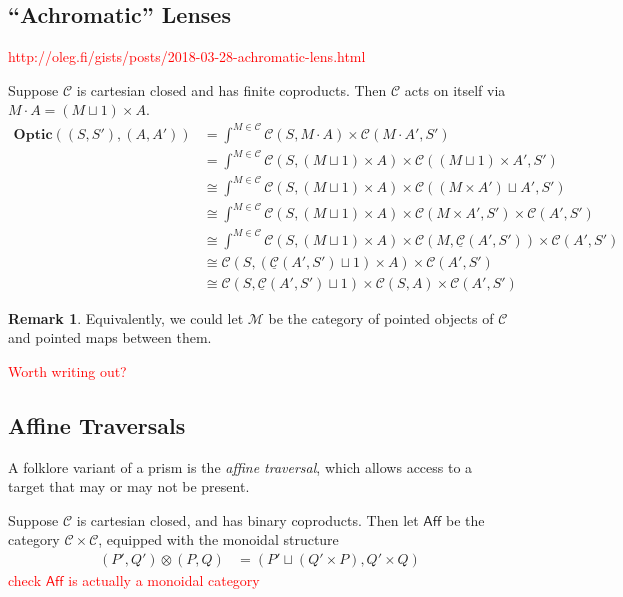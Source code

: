 \documentclass[11pt,a4paper]{article}
\theoremstyle{plain}
\theoremstyle{definition}
\newtheorem{remark}[theorem]{Remark}
\newcommand{\C}{\mathscr{C}}
\newcommand{\homC}{\underline{\C}}
\newcommand{\M}{\mathscr{M}}
\newcommand{\Optic}{\mathbf{Optic}}
\newcommand{\todo}[1]{\textcolor{red}{\small #1}}
\begin{document}
\subsection{``Achromatic'' Lenses}
\todo{http://oleg.fi/gists/posts/2018-03-28-achromatic-lens.html}

Suppose $\C$ is cartesian closed and has finite coproducts. Then $\C$ acts on itself via $M \cdot A = (M \sqcup 1) \times A$.
\begin{align*}
  \Optic((S, S'), (A, A'))
  &= \int^{M \in \C} \C(S, M \cdot A) \times \C(M \cdot A', S') \\
  &= \int^{M \in \C} \C(S, (M \sqcup 1) \times A) \times \C((M \sqcup 1) \times A', S') \\
  &\cong \int^{M \in \C} \C(S, (M \sqcup 1) \times A) \times \C((M \times A') \sqcup A', S') \\
  &\cong \int^{M \in \C} \C(S, (M \sqcup 1) \times A) \times \C(M \times A', S') \times \C(A', S') \\
  &\cong \int^{M \in \C} \C(S, (M \sqcup 1) \times A) \times \C(M, \homC(A', S')) \times \C(A', S') \\
  &\cong \C(S, (\homC(A', S') \sqcup 1) \times A) \times \C(A', S') \\
  &\cong \C(S, \homC(A', S') \sqcup 1) \times \C(S, A) \times \C(A', S')
\end{align*}

\begin{remark}
  Equivalently, we could let $\M$ be the category of pointed objects of $\C$ and pointed maps between them.
\end{remark}

\todo{Worth writing out?}

\subsection{Affine Traversals}

A folklore variant of a prism is the \emph{affine traversal}, which allows access to a target that may or may not be present. 

Suppose $\C$ is cartesian closed, and has binary coproducts. Then let $\mathsf{Aff}$ be the category $\C \times \C$, equipped with the monoidal structure
\begin{align*}
  (P', Q') \otimes (P, Q) &= (P' \sqcup (Q' \times P) , Q' \times Q)
\end{align*}
\todo{check $\mathsf{Aff}$ is actually a monoidal category}
\end{document}
